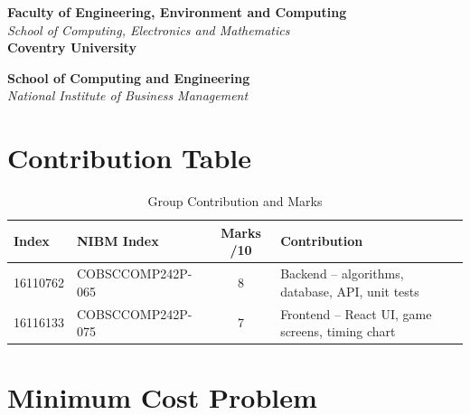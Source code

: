 \documentclass[12pt,a4paper]{article}
\begin{document}
\begin{titlepage}
    \vfill

    {\bfseries Faculty of Engineering, Environment and Computing} \\
    {\itshape School of Computing, Electronics and Mathematics} \\
    {\bfseries Coventry University}

    \vspace{0.8cm}

    {\bfseries School of Computing and Engineering} \\
    {\itshape National Institute of Business Management}

    \vspace{0.5cm}
\end{titlepage}

\newpage
{}
\cfoot{\thepage}

\listoffigures
\newpage

\listoftables
\newpage

\tableofcontents
\newpage

\section*{Contribution Table}

\begin{table}[H]
    \centering
    \caption{Group Contribution and Marks}
    \begin{tabularx}{\textwidth}{|l|l|c|X|}
        \hline
        \textbf{Index} & \textbf{NIBM Index} & \textbf{Marks /10} & \textbf{Contribution} \\
        \hline
        16110762 & COBSCCOMP242P-065 & 8 & Backend -- algorithms, database, API, unit tests \\
        \hline
        16116133 & COBSCCOMP242P-075 & 7 & Frontend -- React UI, game screens, timing chart \\
        \hline
    \end{tabularx}
\end{table}

\newpage

\pagestyle{fancy}
\fancyhf{}
\renewcommand{\headrulewidth}{0pt}
\fancyfoot[R]{\thepage}

\section{Minimum Cost Problem}
\end{document}
